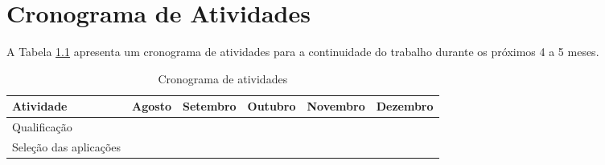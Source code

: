 \chapter{Cronograma de Atividades}

A Tabela \ref{tab:cronograma} apresenta um cronograma de atividades para a continuidade do trabalho
durante os próximos 4 a 5 meses.

\begin{table}[ht]
\centering
\caption{Cronograma de atividades}
\label{tab:cronograma}
\begin{tabular}{|l|l|l|l|l|l|l|l|l|l|l|l|l|l|l|l|l|l|l|l|l|}
\hline
\textbf{Atividade}     & \multicolumn{4}{c|}{\textbf{Agosto}}                                                                     & \multicolumn{4}{c|}{\textbf{Setembro}}                                                                    & \multicolumn{4}{c|}{\textbf{Outubro}}                                                                     & \multicolumn{4}{c|}{\textbf{Novembro}}                                                                    & \multicolumn{4}{c|}{\textbf{Dezembro}}                                                                    \\ \hline
Qualificação           &  & \cellcolor[HTML]{C0C0C0}{\color[HTML]{EFEFEF} } &                          &                          &                          &                          &                          &                          &                          &                          &                          &                          &                          &                          &                          &                          &                          &                          &                          &                          \\ \hline
Seleção das aplicações &  &                                                 & \cellcolor[HTML]{C0C0C0} &                          &                          &                          &                          &                          &                          &                          &                          &                          &                          &                          &                          &                          &                          &                          &                          &                          \\ \hline

\end{tabular}
\end{table}
